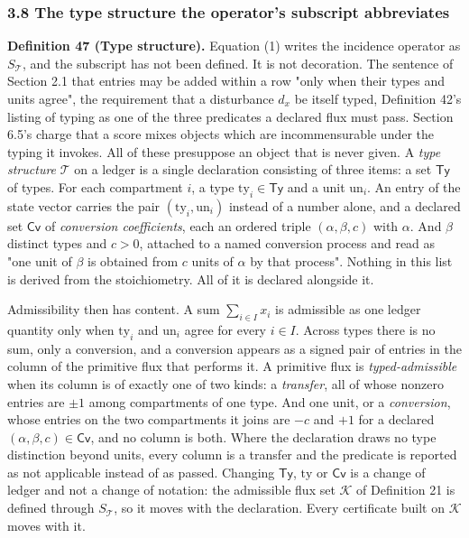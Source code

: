 \documentclass[11pt]{article}
\begin{document}
\subsubsection{3.8 The type structure the operator's subscript abbreviates}\label{3-8-the-type-structure-the-operator-s-subscript-abbreviates}


\textbf{Definition 47 (Type structure).} Equation (1) writes the incidence operator as \(S_{\mathcal{T}}\), and the subscript has not been defined. It is not decoration. The sentence of Section 2.1 that entries may be added within a row "only when their types and units agree", the requirement that a disturbance \(d_x\) be itself typed, Definition 42's listing of typing as one of the three predicates a declared flux must pass. Section 6.5's charge that a score mixes objects which are incommensurable under the typing it invokes. All of these presuppose an object that is never given. A \emph{type structure} \(\mathcal{T}\) on a ledger is a single declaration consisting of three items: a set \(\mathsf{Ty}\) of types. For each compartment \(i\), a type \(\mathrm{ty}_i \in \mathsf{Ty}\) and a unit \(\mathrm{un}_i\). An entry of the state vector carries the pair \((\mathrm{ty}_i, \mathrm{un}_i)\) instead of a number alone, and a declared set \(\mathsf{Cv}\) of \emph{conversion
coefficients}, each an ordered triple \((\alpha, \beta, c)\) with \(\alpha\). And \(\beta\) distinct types and \(c > 0\), attached to a named conversion process and read as "one unit of \(\beta\) is obtained from \(c\) units of \(\alpha\) by that process". Nothing in this list is derived from the stoichiometry. All of it is declared alongside it.

Admissibility then has content. A sum \(\sum_{i \in I} x_i\) is admissible as one ledger quantity only when \(\mathrm{ty}_i\) and \(\mathrm{un}_i\) agree for every \(i \in I\). Across types there is no sum, only a conversion, and a conversion appears as a signed pair of entries in the column of the primitive flux that performs it. A primitive flux is \emph{typed-admissible} when its column is of exactly one of two kinds: a \emph{transfer}, all of whose nonzero entries are \(\pm 1\) among compartments of one type. And one unit, or a \emph{conversion}, whose entries on the two compartments it joins are \(-c\) and \(+1\) for a declared \((\alpha, \beta, c) \in \mathsf{Cv}\), and no column is both. Where the declaration draws no type distinction beyond units, every column is a transfer and the predicate is reported as not applicable instead of as passed. Changing \(\mathsf{Ty}\), \(\mathrm{ty}\) or \(\mathsf{Cv}\) is a change of ledger and not a change of notation: the admissible flux set \(\mathcal{K}\) of Definition 21 is defined through \(S_{\mathcal{T}}\), so it moves with the declaration. Every certificate built on \(\mathcal{K}\) moves with it.
\end{document}
